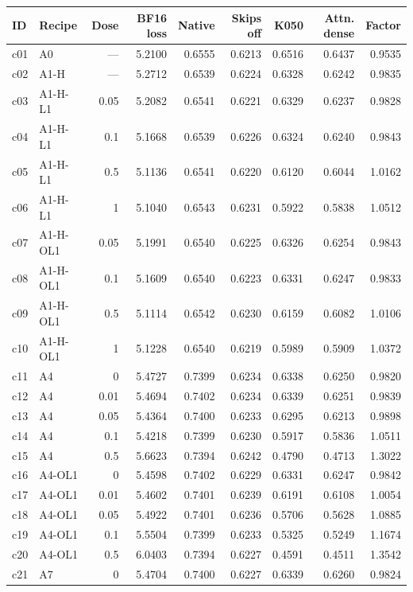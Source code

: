 \begin{tabular}{@{}llrrrrrrr@{}}
\toprule
ID & Recipe & Dose & BF16 loss & Native & Skips off & K050 & Attn. dense & Factor \\
\midrule
c01 & A0 & --- & 5.2100 & 0.6555 & 0.6213 & 0.6516 & 0.6437 & 0.9535 \\
c02 & A1-H & --- & 5.2712 & 0.6539 & 0.6224 & 0.6328 & 0.6242 & 0.9835 \\
c03 & A1-H-L1 & 0.05 & 5.2082 & 0.6541 & 0.6221 & 0.6329 & 0.6237 & 0.9828 \\
c04 & A1-H-L1 & 0.1 & 5.1668 & 0.6539 & 0.6226 & 0.6324 & 0.6240 & 0.9843 \\
c05 & A1-H-L1 & 0.5 & 5.1136 & 0.6541 & 0.6220 & 0.6120 & 0.6044 & 1.0162 \\
c06 & A1-H-L1 & 1 & 5.1040 & 0.6543 & 0.6231 & 0.5922 & 0.5838 & 1.0512 \\
c07 & A1-H-OL1 & 0.05 & 5.1991 & 0.6540 & 0.6225 & 0.6326 & 0.6254 & 0.9843 \\
c08 & A1-H-OL1 & 0.1 & 5.1609 & 0.6540 & 0.6223 & 0.6331 & 0.6247 & 0.9833 \\
c09 & A1-H-OL1 & 0.5 & 5.1114 & 0.6542 & 0.6230 & 0.6159 & 0.6082 & 1.0106 \\
c10 & A1-H-OL1 & 1 & 5.1228 & 0.6540 & 0.6219 & 0.5989 & 0.5909 & 1.0372 \\
c11 & A4 & 0 & 5.4727 & 0.7399 & 0.6234 & 0.6338 & 0.6250 & 0.9820 \\
c12 & A4 & 0.01 & 5.4694 & 0.7402 & 0.6234 & 0.6339 & 0.6251 & 0.9839 \\
c13 & A4 & 0.05 & 5.4364 & 0.7400 & 0.6233 & 0.6295 & 0.6213 & 0.9898 \\
c14 & A4 & 0.1 & 5.4218 & 0.7399 & 0.6230 & 0.5917 & 0.5836 & 1.0511 \\
c15 & A4 & 0.5 & 5.6623 & 0.7394 & 0.6242 & 0.4790 & 0.4713 & 1.3022 \\
c16 & A4-OL1 & 0 & 5.4598 & 0.7402 & 0.6229 & 0.6331 & 0.6247 & 0.9842 \\
c17 & A4-OL1 & 0.01 & 5.4602 & 0.7401 & 0.6239 & 0.6191 & 0.6108 & 1.0054 \\
c18 & A4-OL1 & 0.05 & 5.4922 & 0.7401 & 0.6236 & 0.5706 & 0.5628 & 1.0885 \\
c19 & A4-OL1 & 0.1 & 5.5504 & 0.7399 & 0.6233 & 0.5325 & 0.5249 & 1.1674 \\
c20 & A4-OL1 & 0.5 & 6.0403 & 0.7394 & 0.6227 & 0.4591 & 0.4511 & 1.3542 \\
c21 & A7 & 0 & 5.4704 & 0.7400 & 0.6227 & 0.6339 & 0.6260 & 0.9824 \\

\end{tabular}
